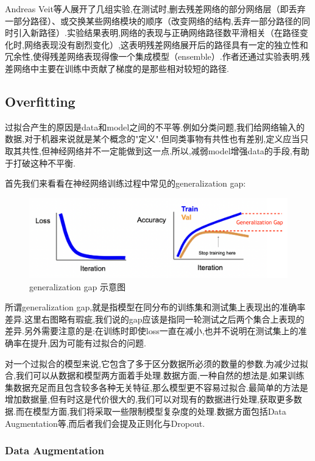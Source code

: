 Andreas Veit等人展开了几组实验,在测试时,删去残差网络的部分网络层（即丢弃一部分路径）、或交换某些网络模块的顺序（改变网络的结构,丢弃一部分路径的同时引入新路径）.实验结果表明,网络的表现与正确网络路径数平滑相关（在路径变化时,网络表现没有剧烈变化）,这表明残差网络展开后的路径具有一定的独立性和冗余性,使得残差网络表现得像一个集成模型（ensemble）.作者还通过实验表明,残差网络中主要在训练中贡献了梯度的是那些相对较短的路径.


\subsection{Overfitting}

过拟合产生的原因是data和model之间的不平等.例如分类问题,我们给网络输入的数据,对于机器来说就是某个概念的"定义".但同类事物有共性也有差别,定义应当只取其共性,但神经网络并不一定能做到这一点.所以,减弱model增强data的手段,有助于打破这种不平衡.

首先我们来看看在神经网络训练过程中常见的generalization gap:
\begin{figure}[htbp]
	\centering
	\includegraphics[scale=0.65]{figures/generalgap.png}
	\caption{generalization gap 示意图}
	\label{}
\end{figure}

所谓generalization gap,就是指模型在同分布的训练集和测试集上表现出的准确率差异.这里右图略有瑕疵,我们说的gap应该是指同一轮测试之后两个集合上表现的差异.另外需要注意的是:在训练时即使loss一直在减小,也并不说明在测试集上的准确率在提升,因为可能有过拟合的问题.

对一个过拟合的模型来说,它包含了多于区分数据所必须的数量的参数.为减少过拟合,我们可以从数据和模型两方面着手处理.数据方面,一种自然的想法是,如果训练集数据充足而且包含较多各种无关特征,那么模型更不容易过拟合.最简单的方法是增加数据量,但有时这是代价很大的,我们可以对现有的数据进行处理,获取更多数据.而在模型方面,我们将采取一些限制模型复杂度的处理.数据方面包括Data Augmentation等,而后者我们会提及正则化与Dropout.

\subsubsection{Data Augmentation}

